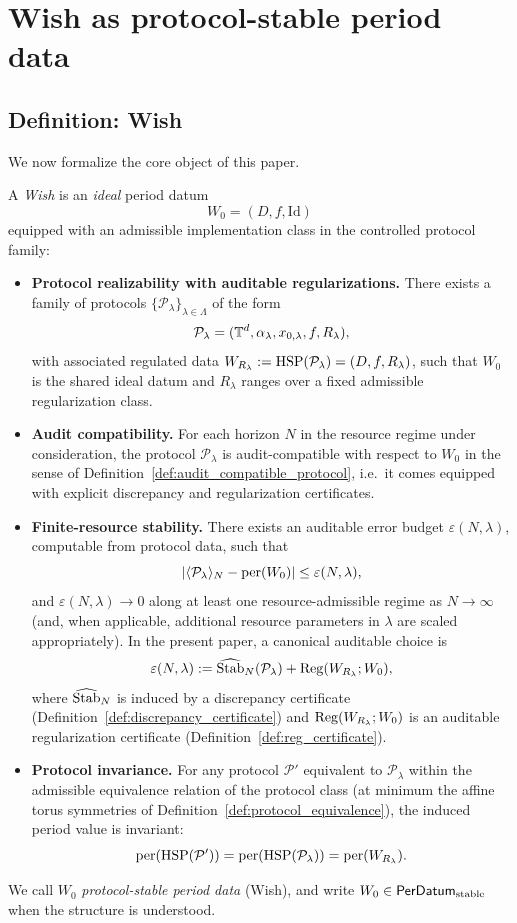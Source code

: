 
\section{Wish as protocol-stable period data}
\label{sec:wish}

\subsection{Definition: Wish}
\label{sec:wish_definition}

We now formalize the core object of this paper.

\begin{definition}
\label{def:wish}
A \emph{Wish} is an \emph{ideal} period datum
\[
W_0=(D,f,\mathrm{Id})
\]
equipped with an admissible implementation class in the controlled protocol family:
\begin{itemize}
\item \textbf{Protocol realizability with auditable regularizations.}
There exists a family of protocols $\{\mathcal{P}_\lambda\}_{\lambda\in\Lambda}$ of the form
\[
\mathcal{P}_\lambda=(\mathbb{T}^d,\alpha_\lambda,x_{0,\lambda},f,R_\lambda),
\]
with associated regulated data $W_{R_\lambda}:=\mathrm{HSP}(\mathcal{P}_\lambda)=(D,f,R_\lambda)$, such that $W_0$ is the shared ideal datum and $R_\lambda$ ranges over a fixed admissible regularization class.
\item \textbf{Audit compatibility.}
For each horizon $N$ in the resource regime under consideration, the protocol $\mathcal{P}_\lambda$ is audit-compatible with respect to $W_0$ in the sense of Definition~\ref{def:audit_compatible_protocol}, i.e.\ it comes equipped with explicit discrepancy and regularization certificates.
\item \textbf{Finite-resource stability.} There exists an auditable error budget $\varepsilon(N,\lambda)$, computable from protocol data, such that
\[
\left|\langle \mathcal{P}_\lambda \rangle_N-\mathrm{per}(W_0)\right|\le \varepsilon(N,\lambda),
\]
and $\varepsilon(N,\lambda)\to 0$ along at least one resource-admissible regime as $N\to\infty$ (and, when applicable, additional resource parameters in $\lambda$ are scaled appropriately).
In the present paper, a canonical auditable choice is
\[
\varepsilon(N,\lambda)
:=
\widehat{\mathrm{Stab}}_N(\mathcal{P}_\lambda)+\mathrm{Reg}(W_{R_\lambda};W_0),
\]
where $\widehat{\mathrm{Stab}}_N$ is induced by a discrepancy certificate (Definition~\ref{def:discrepancy_certificate}) and $\mathrm{Reg}(W_{R_\lambda};W_0)$ is an auditable regularization certificate (Definition~\ref{def:reg_certificate}).
\item \textbf{Protocol invariance.} For any protocol $\mathcal{P}'$ equivalent to $\mathcal{P}_\lambda$ within the admissible equivalence relation of the protocol class (at minimum the affine torus symmetries of Definition~\ref{def:protocol_equivalence}), the induced period value is invariant:
\[
\mathrm{per}(\mathrm{HSP}(\mathcal{P}'))=\mathrm{per}(\mathrm{HSP}(\mathcal{P}_\lambda))=\mathrm{per}(W_{R_\lambda}).
\]
\end{itemize}
We call $W_0$ \emph{protocol-stable period data} (Wish), and write $W_0\in\mathsf{PerDatum}_{\mathrm{stable}}$ when the structure is understood.
\end{definition}

